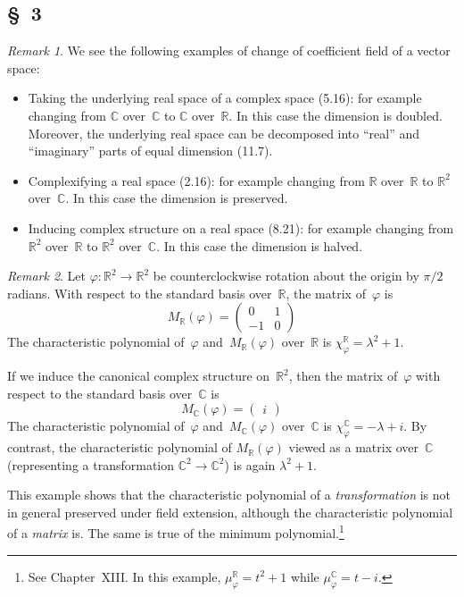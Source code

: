 \documentclass[letterpaper,12pt]{article}
\newcommand{\R}{\mathbb{R}}
\newcommand{\C}{\mathbb{C}}
\theoremstyle{definition}
\theoremstyle{remark}
\newtheorem*{rmk}{Remark}
\begin{document}
\subsection*{\S~3}
\begin{rmk}
We see the following examples of change of coefficient field of a vector space:
\begin{itemize}
\item Taking the underlying real space of a complex space (5.16): for example changing from \(\C\) over~\(\C\) to \(\C\) over~\(\R\). In this case the dimension is doubled. Moreover, the underlying real space can be decomposed into ``real'' and ``imaginary'' parts of equal dimension (11.7).
\item Complexifying a real space (2.16): for example changing from \(\R\) over~\(\R\) to \(\R^2\) over~\(\C\). In this case the dimension is preserved.
\item Inducing complex structure on a real space (8.21): for example changing from \(\R^2\) over~\(\R\) to \(\R^2\) over~\(\C\). In this case the dimension is halved.
\end{itemize}
\end{rmk}

\begin{rmk}
Let \(\varphi:\R^2\to\R^2\) be counterclockwise rotation about the origin by \(\pi/2\) radians. With respect to the standard basis over~\(\R\), the matrix of~\(\varphi\) is
\[M_{\R}(\varphi)=\begin{pmatrix}
0&1\\
-1&0
\end{pmatrix}\]
The characteristic polynomial of~\(\varphi\) and~\(M_{\R}(\varphi)\) over~\(\R\) is \(\chi_{\varphi}^{\R}=\lambda^2+1\).

If we induce the canonical complex structure on~\(\R^2\), then the matrix of~\(\varphi\) with respect to the standard basis over~\(\C\) is
\[M_{\C}(\varphi)=\begin{pmatrix}i\end{pmatrix}\]
The characteristic polynomial of~\(\varphi\) and~\(M_{\C}(\varphi)\) over~\(\C\) is \(\chi_{\varphi}^{\C}=-\lambda+i\). By contrast, the characteristic polynomial of \(M_{\R}(\varphi)\) viewed as a matrix over~\(\C\) (representing a transformation \(\C^2\to\C^2\)) is again \(\lambda^2+1\).

This example shows that the characteristic polynomial of a \emph{transformation} is not in general preserved under field extension, although the characteristic polynomial of a \emph{matrix} is. The same is true of the minimum polynomial.\footnote{See Chapter~XIII. In this example, \(\mu_{\varphi}^{\R}=t^2+1\) while \(\mu_{\varphi}^{\C}=t-i\).}
\end{rmk}
\end{document}
